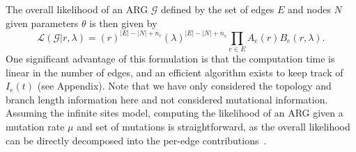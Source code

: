 \documentclass{article}
\newcommand{\comment}[1]{{\it \color{orange} (#1)}}
\begin{document}
The overall likelihood of an ARG $\mathcal{G}$ defined by the set of edges $E$ and nodes $N$
given parameters $\theta$ is then given by
\begin{equation}\label{eq:full-lik}
    \mathcal{L}(\mathcal{G}|r, \lambda)
    =
    (r)^{|E|-|N|+n_r} (\lambda)^{|E|-|N|+n_s} \prod_{e \in E} A_e(r) B_e(r, \lambda) .
\end{equation}
One significant advantage of this formulation is that the computation time
is linear in the number of edges, and an efficient algorithm exists
to keep track of $I_e(t)$ (see Appendix).
Note that we have only considered the topology and branch length information here
and not considered mutational information. 
Assuming the infinite sites model, computing the likelihood of 
an ARG given a mutation rate $\mu$ and set of mutations is straightforward, 
as the overall likelihood can be directly decomposed into the per-edge
contributions~\citep{baumdicker_efficient_2021,mahmoudi_bayesian_2022}.
\end{document}
